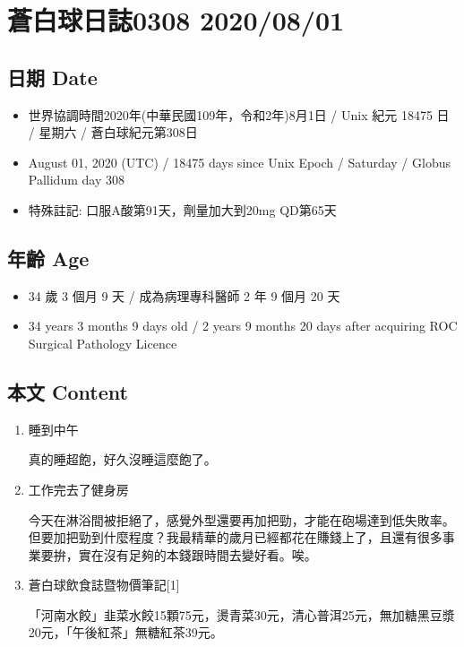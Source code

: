 \documentclass[
]{article}
\author{}
\date{}
\providecommand{\tightlist}{%
  \setlength{\itemsep}{0pt}\setlength{\parskip}{0pt}}
\begin{document}
\hypertarget{ux84bcux767dux7403ux65e5ux8a8c0308-20200801}{%
\section{蒼白球日誌0308
2020/08/01}\label{ux84bcux767dux7403ux65e5ux8a8c0308-20200801}}

\hypertarget{ux65e5ux671f-date}{%
\subsection{日期 Date}\label{ux65e5ux671f-date}}

\begin{itemize}
\tightlist
\item
  世界協調時間2020年(中華民國109年，令和2年)8月1日 / Unix 紀元 18475 日
  / 星期六 / 蒼白球紀元第308日
\item
  August 01, 2020 (UTC) / 18475 days since Unix Epoch / Saturday /
  Globus Pallidum day 308
\item
  特殊註記: 口服A酸第91天，劑量加大到20mg QD第65天
\end{itemize}

\hypertarget{ux5e74ux9f61-age}{%
\subsection{年齡 Age}\label{ux5e74ux9f61-age}}

\begin{itemize}
\tightlist
\item
  34 歲 3 個月 9 天 / 成為病理專科醫師 2 年 9 個月 20 天
\item
  34 years 3 months 9 days old / 2 years 9 months 20 days after
  acquiring ROC Surgical Pathology Licence
\end{itemize}

\hypertarget{ux672cux6587-content}{%
\subsection{本文 Content}\label{ux672cux6587-content}}

\begin{enumerate}
\def\labelenumi{\arabic{enumi}.}
\item
  睡到中午

  真的睡超飽，好久沒睡這麼飽了。
\item
  工作完去了健身房

  今天在淋浴間被拒絕了，感覺外型還要再加把勁，才能在砲場達到低失敗率。但要加把勁到什麼程度？我最精華的歲月已經都花在賺錢上了，且還有很多事業要拚，實在沒有足夠的本錢跟時間去變好看。唉。
\item
  蒼白球飲食誌暨物價筆記{[}1{]}

  「河南水餃」韭菜水餃15顆75元，燙青菜30元，清心普洱25元，無加糖黑豆漿20元，「午後紅茶」無糖紅茶39元。
\end{enumerate}
\end{document}
